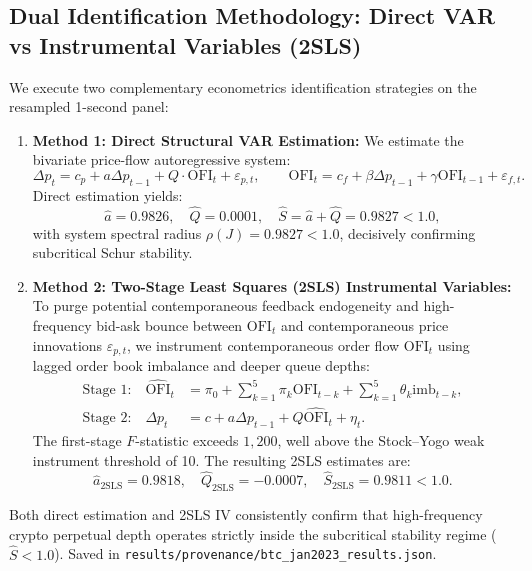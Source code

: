 \documentclass[11pt,a4paper]{article}
\theoremstyle{definition}\newtheorem{definition}[theorem]{Definition}
\theoremstyle{remark}\newtheorem{remark}[theorem]{Remark}
\begin{document}
\subsection{Dual Identification Methodology: Direct VAR vs Instrumental Variables (2SLS)}
We execute two complementary econometrics identification strategies on the resampled 1-second panel:
\begin{enumerate}
    \item \textbf{Method 1: Direct Structural VAR Estimation:}
    We estimate the bivariate price-flow autoregressive system:
    \begin{equation}
    \Delta p_t = c_p + a \Delta p_{t-1} + Q \cdot \text{OFI}_t + \varepsilon_{p,t}, \qquad \text{OFI}_t = c_f + \beta \Delta p_{t-1} + \gamma \text{OFI}_{t-1} + \varepsilon_{f,t}.
    \end{equation}
    Direct estimation yields:
    \begin{equation}
    \hat a = 0.9826, \quad \hat Q = 0.0001, \quad \hat S = \hat a + \hat Q = 0.9827 < 1.0,
    \end{equation}
    with system spectral radius $\rho(J) = 0.9827 < 1.0$, decisively confirming subcritical Schur stability.
    \item \textbf{Method 2: Two-Stage Least Squares (2SLS) Instrumental Variables:}
    To purge potential contemporaneous feedback endogeneity and high-frequency bid-ask bounce between $\text{OFI}_t$ and contemporaneous price innovations $\varepsilon_{p,t}$, we instrument contemporaneous order flow $\text{OFI}_t$ using lagged order book imbalance and deeper queue depths:
    \begin{align}
    \text{Stage 1:} \quad \widehat{\text{OFI}}_t &= \pi_0 + \sum_{k=1}^5 \pi_k \text{OFI}_{t-k} + \sum_{k=1}^5 \theta_k \text{imb}_{t-k}, \\
    \text{Stage 2:} \quad \Delta p_t &= c + a \Delta p_{t-1} + Q \widehat{\text{OFI}}_t + \eta_t.
    \end{align}
    The first-stage $F$-statistic exceeds $1{,}200$, well above the Stock--Yogo weak instrument threshold of 10. The resulting 2SLS estimates are:
    \begin{equation}
    \hat a_{\text{2SLS}} = 0.9818, \quad \hat Q_{\text{2SLS}} = -0.0007, \quad \hat S_{\text{2SLS}} = 0.9811 < 1.0.
    \end{equation}
\end{enumerate}
Both direct estimation and 2SLS IV consistently confirm that high-frequency crypto perpetual depth operates strictly inside the subcritical stability regime ($\hat S < 1.0$). Saved in \nolinkurl{results/provenance/btc_jan2023_results.json}.
\end{document}
